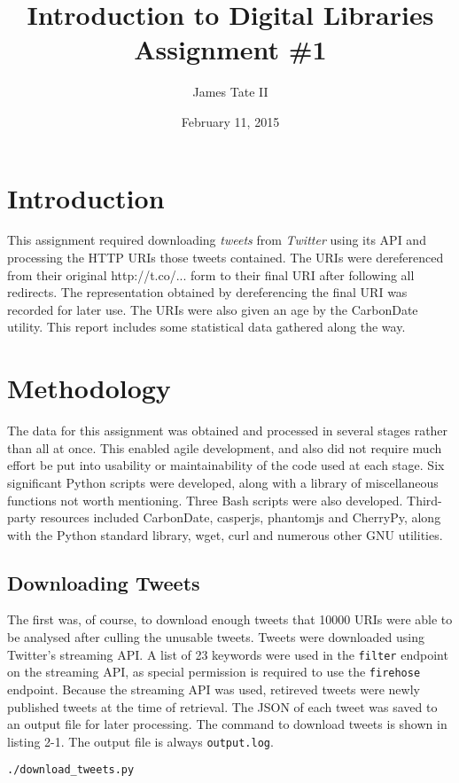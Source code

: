 \documentclass[a4paper,12pt]{article}
\begin{document}
\renewcommand{\thelstlisting}{\thesection-\arabic{lstlisting}}

\title{Introduction to Digital Libraries Assignment \#1}
\date{February 11, 2015}
\author{James Tate II}
\maketitle

\section{Introduction}
This assignment required downloading \emph{tweets} from \emph{Twitter} using its API and processing the HTTP URIs
those tweets contained. The URIs were dereferenced from their original http://t.co/... form to their final
URI after following all redirects. The representation obtained by dereferencing the final URI was recorded
for later use. The URIs were also given an age by the CarbonDate utility. This report includes some statistical
data gathered along the way.

\section{Methodology}
The data for this assignment was obtained and processed in several stages rather than all at once. 
This enabled agile development, and also did not require much effort be put into usability or maintainability 
of the code used at each stage. Six significant Python scripts were developed, along with a library of
miscellaneous functions not worth mentioning. Three Bash scripts were also developed. Third-party resources
included CarbonDate, casperjs, phantomjs and CherryPy, along with the Python standard library, wget, curl and numerous other GNU utilities.

\subsection{Downloading Tweets}
The first was, of course, to download enough tweets that 10000 URIs were able to be analysed after culling
the unusable tweets. Tweets were downloaded using Twitter's streaming API. A list of 23 keywords were used in
the \texttt{filter} endpoint on the streaming API, as special permission is required to use the \texttt{firehose}
endpoint. Because the streaming API was used, retireved tweets were newly published tweets at the time of
retrieval. The JSON of each tweet was saved to an output file for later processing. The command to download
tweets is shown in listing 2-1. The output file is always \texttt{output.log}.
\begin{lstlisting}[basicstyle=\ttfamily,caption={Downloading Tweets}]
    ./download_tweets.py
\end{lstlisting}
\end{document}
